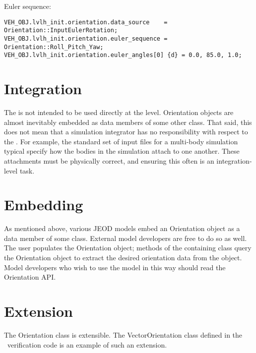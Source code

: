 Euler sequence:
\begin{verbatim}
VEH_OBJ.lvlh_init.orientation.data_source    = Orientation::InputEulerRotation;
VEH_OBJ.lvlh_init.orientation.euler_sequence = Orientation::Roll_Pitch_Yaw;
VEH_OBJ.lvlh_init.orientation.euler_angles[0] {d} = 0.0, 85.0, 1.0;
\end{verbatim}


\section{Integration}
The \ModelDesc is not intended to be used directly at the \Sdefine level.
Orientation objects are almost inevitably embedded as data members of some other
class. That said, this does not mean that a simulation integrator has no
responsibility with respect to the \ModelDesc. For example, the standard set of
input files for a multi-body simulation typical specify how the bodies in the
simulation attach to one another. These attachments must be physically correct,
and ensuring this often is an integration-level task.


\section{Embedding}
As mentioned above, various JEOD models embed an Orientation object as a data
member of some class. External model developers are free to do so as well.
The user populates the Orientation object; methods of the containing class query
the Orientation object to extract the desired orientation data from the object. 
Model developers who wish to use the model in this way should read the
Orientation API.

\section{Extension}
The Orientation class is extensible. The VectorOrientation class defined in the
\INTEGRATION\ verification code is an example of such an extension.